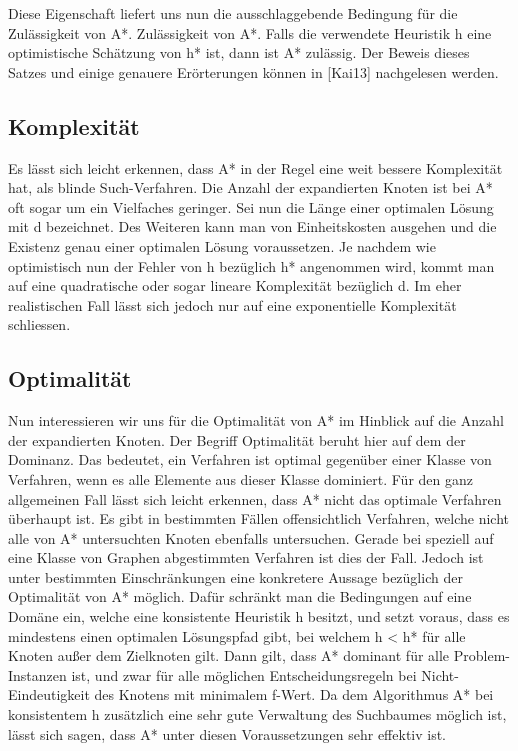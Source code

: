 Diese Eigenschaft liefert uns nun die ausschlaggebende Bedingung f\"ur die Zul\"assigkeit von A*. Zul\"assigkeit von A*. Falls die verwendete Heuristik h eine optimistische Sch\"atzung von h* ist, dann ist A* zul\"assig. 
Der Beweis dieses Satzes und einige genauere Er\"orterungen k\"onnen in [Kai13] nachgelesen werden. 

\subsection{Komplexit\"at}
Es l\"asst sich leicht erkennen, dass A* in der Regel eine weit bessere Komplexit\"at hat, als blinde Such-Verfahren. Die Anzahl der expandierten Knoten ist bei A* oft sogar um ein Vielfaches geringer. Sei nun die L\"ange einer optimalen L\"osung mit d bezeichnet. Des Weiteren kann man von Einheitskosten ausgehen und die Existenz genau einer optimalen L\"osung voraussetzen. Je nachdem wie optimistisch nun der Fehler von h bez\"uglich h* angenommen wird, kommt man auf eine quadratische oder sogar lineare Komplexit\"at bez\"uglich d. Im eher realistischen Fall l\"asst sich jedoch nur auf eine exponentielle Komplexit\"at schliessen. 

\subsection{Optimalit\"at}
Nun interessieren wir uns f\"ur die Optimalit\"at von A* im Hinblick auf die Anzahl der expandierten Knoten. Der Begriff Optimalit\"at beruht hier auf dem der Dominanz. Das bedeutet, ein Verfahren ist optimal gegen\"uber einer Klasse von Verfahren, wenn es alle Elemente aus dieser Klasse dominiert. F\"ur den ganz allgemeinen Fall l\"asst sich leicht erkennen, dass A* nicht das optimale Verfahren \"uberhaupt ist. Es gibt in bestimmten F\"allen offensichtlich Verfahren, welche nicht alle von A* untersuchten Knoten ebenfalls untersuchen. Gerade bei speziell auf eine Klasse von Graphen abgestimmten Verfahren ist dies der Fall. Jedoch ist unter bestimmten Einschr\"ankungen eine konkretere Aussage bez\"uglich der Optimalit\"at von A* m\"oglich. Daf\"ur schr\"ankt man die Bedingungen auf eine Dom\"ane ein, welche eine konsistente Heuristik h besitzt, und setzt voraus, dass es mindestens einen optimalen L\"osungspfad gibt, bei welchem h < h* f\"ur alle Knoten au\ss er dem Zielknoten gilt. Dann gilt, dass A* dominant f\"ur alle Problem-Instanzen ist, und zwar f\"ur alle m\"oglichen Entscheidungsregeln bei Nicht-Eindeutigkeit des Knotens mit minimalem f-Wert. Da dem Algorithmus A* bei konsistentem h zus\"atzlich eine sehr gute Verwaltung des Suchbaumes m\"oglich ist, l\"asst sich sagen, dass A* unter diesen Voraussetzungen sehr effektiv ist. 

